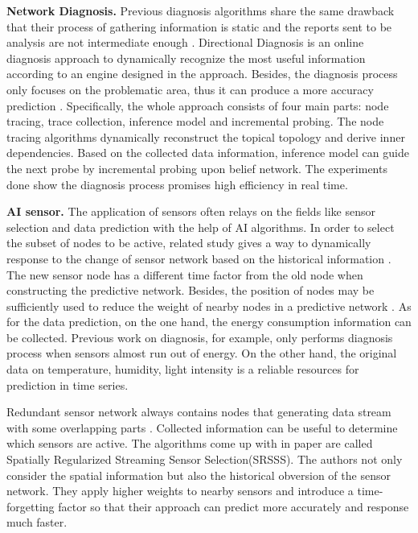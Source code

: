 \textbf{Network Diagnosis.}
Previous diagnosis algorithms share the same drawback 
that their process of gathering information is static and the reports sent to be 
analysis are not intermediate enough \cite{Ramanathan2005Sympathy,Khan2010Diagnostic}. 
Directional Diagnosis \cite{gong2015directional} is an online diagnosis approach to dynamically 
recognize the most useful information according to an engine designed in the approach. 
Besides, the diagnosis process only focuses on the problematic area, 
thus it can produce a more accuracy prediction \cite{Pavlou2015How}. 
Specifically, the whole approach consists of four main parts: 
node tracing, trace collection, inference model and incremental probing. 
The node tracing algorithms dynamically reconstruct the topical topology and derive inner dependencies. 
Based on the collected data information, inference model can guide the next probe 
by incremental probing upon belief network. The experiments done show the diagnosis 
process promises high efficiency in real time.

\textbf{AI sensor.}
The application of sensors often relays on the fields 
like sensor selection and data prediction with the help of AI algorithms. 
In order to select the subset of nodes to be active, related study gives a way to dynamically 
response to the change of sensor network based on the historical information \cite{Mo2013Dynamic}.
The new sensor node has a different time factor from the old 
node when constructing the predictive network. 
Besides, the position of nodes may be sufficiently used to reduce the weight of 
nearby nodes in a predictive network \cite{Kumar2017Edge}. 
As for the data prediction, on the one hand, the energy consumption information 
can be collected. Previous work on diagnosis, for example, only performs 
diagnosis process when sensors almost run out of energy. On the other hand, the original 
data on temperature, humidity, light intensity is a reliable resources for 
prediction in time series\cite{Raza2014Practical}. 

Redundant sensor network always contains nodes that generating data 
stream with some overlapping parts \cite{Ali1995Redundant}. 
Collected information can be useful to determine which sensors are active. 
The algorithms come up with in paper\cite{li2016spatially} are called Spatially Regularized Streaming Sensor Selection(SRSSS). 
The authors not only consider the spatial information but also the historical obversion of the sensor network. 
They apply higher weights to nearby sensors and introduce a time-forgetting factor \cite{Astrom1989Adaptive} so that their approach can predict more accurately and response much faster.
	
